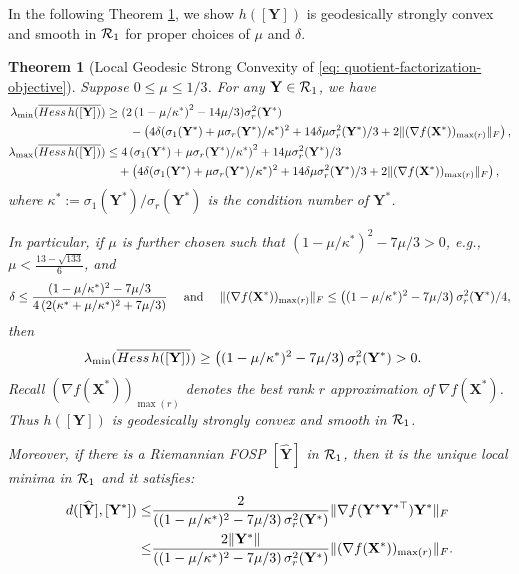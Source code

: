\documentclass[11pt]{article}
\newtheorem{Theorem}{Theorem}
\newcommand{\0}{{\mathbf{0}}}
\newcommand{\1}{{\mathbf{1}}}
\newcommand{\X}{{\mathbf{X}}}
\newcommand{\Y}{{\mathbf{Y}}}
\newcommand{\cR}{{\cal R}}
\newcommand{\Hess}{{\rm Hess}}
\newcommand{\F}{{\rm F}}
\begin{document}
In the following Theorem \ref{th: h-local-geodesic-convexity}, we show $h([\Y])$ is geodesically strongly convex and smooth in $\cR_1$ for proper choices of $\mu$ and $\delta$.
\begin{Theorem}[Local Geodesic Strong Convexity of \eqref{eq: quotient-factorization-objective}] \label{th: h-local-geodesic-convexity}
Suppose $ 0\leq  \mu \leq 1/3$. For any $\Y \in \cR_1$, we have 
 \begin{equation*}
 	\begin{split}
 		\lambda_{\min}( \overline{\Hess\, h([\Y])} ) & \geq   ( 2 \left( 1 - \mu/ \kappa^* \right)^2 - 14 \mu/3 ) \sigma^2_r(\Y^*) \\
 		& \quad \quad -   \left(  4\delta ( \sigma_1(\Y^*) +  \mu \sigma_r(\Y^*)/ \kappa^*  )^2 + 14 \delta  \mu \sigma^2_r(\Y^*)/3 + 2 \| ( \nabla f(\X^*) )_{\max(r)} \|_\F  \right) ,\\
 		\lambda_{\max} ( \overline{\Hess \, h([\Y])}  ) & \leq 4\left(   \sigma_1(\Y^*) + \mu \sigma_r(\Y^*)/\kappa^* \right)^2 + 14\mu \sigma^2_r(\Y^*)/3 \\
			 & \quad  + \left(  4\delta ( \sigma_1(\Y^*) +  \mu \sigma_r(\Y^*)/ \kappa^*  )^2 + 14 \delta  \mu \sigma^2_r(\Y^*)/3 + 2 \| ( \nabla f(\X^*) )_{\max(r)} \|_\F  \right),
 	\end{split}
 \end{equation*} where $\kappa^*:= \sigma_1(\Y^*)/\sigma_r(\Y^*)$ is the condition number of $\Y^*$.
 
 In particular, if $\mu$ is further chosen such that $ \left( 1 - \mu /\kappa^* \right)^2 - 7\mu/3 > 0$, {e.g., $\mu < \frac{13 - \sqrt{133}}{6}$}, and
 \begin{equation*}
 	\delta \leq \frac{(1-\mu/\kappa^*)^2 - 7\mu/3}{ 4\left(2 ( \kappa^* + \mu/\kappa^* )^2 + 7\mu/3 \right) }\quad  \text{ and }\quad  \| (\nabla f(\X^*))_{\max(r)} \|_\F \leq \left( (1-\mu/\kappa^*)^2 - 7\mu/3 \right) \sigma^2_r(\Y^*)/4,
 \end{equation*}
then 
  \begin{equation*}
 	\begin{split}
 		\lambda_{\min}( \overline{\Hess\, h([\Y])} ) & \geq   \left( (1-\mu/\kappa^*)^2 - 7\mu/3 \right) \sigma^2_r(\Y^*) > 0.
 		\end{split}
 \end{equation*} Recall $ (\nabla f(\X^*))_{\max(r)}$ denotes the best rank $r$ approximation of $\nabla f(\X^*)$. Thus $h([\Y])$ is geodesically strongly convex and smooth in $\cR_1$. 
 
 Moreover, if there is a Riemannian FOSP $[\widehat{\Y}]$ in $\cR_1$, then it is the unique local minima in $\cR_1$ and it satisfies: 
 \begin{equation} \label{ineq: dist-bound-hatY-Ystar}
 \begin{split}
 	d([\widehat{\Y}], [\Y^*] ) \leq & \frac{2}{ \left((1-\mu/\kappa^*)^2 - 7\mu/3\right) \sigma^2_r(\Y^*) } \| \nabla f(\Y^*\Y^{*\top})\Y^* \|_\F \\
 	\leq & \frac{2\|\Y^{*}\|}{ \left((1-\mu/\kappa^*)^2 - 7\mu/3\right) \sigma^2_r(\Y^*) } \| (\nabla f(\X^*))_{\max(r)} \|_\F.
 \end{split}
 \end{equation}
\end{Theorem}
\end{document}
